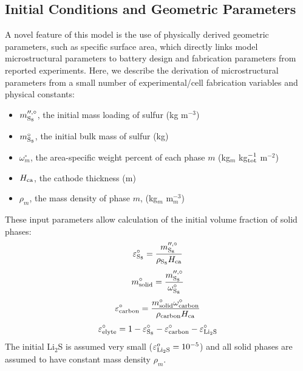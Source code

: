 \documentclass{elsarticle}
\begin{document}
\subsection{Initial Conditions and Geometric Parameters}
A novel feature of this model is the use of physically derived geometric parameters, such as specific surface area, which directly links model microstructural parameters to  battery design and fabrication parameters from reported experiments. Here, we describe the derivation of  microstructural parameters from a small number of experimental/cell fabrication variables and physical constants:
\begin{itemize}
    \item $m^{\prime\prime,\circ}_{\rm S_8}$, the initial mass loading of sulfur (kg m$^{-3}$)
    \item $m^\circ_{\rm S_8}$, the initial bulk mass of sulfur (kg)
    \item $\omega^\circ_m$, the area-specific weight percent of each phase $m$ (kg$_m$ kg$^{-1}_{\rm tot}$ m$^{-2}$)
    \item $H_{\rm ca}$, the cathode thickness (m)
    \item $\rho_m$, the mass density of phase $m$, (kg$_m$ m$^{-3}_m$)
\end{itemize}
These input parameters allow calculation of the initial volume fraction of solid phases:
\begin{equation}\label{eq:esp_S8_o}
    \varepsilon_{\rm S_8}^\circ = \frac{m^{\prime\prime,\circ}_{\rm S_8}}{\rho_{\rm S_8} H_{\rm ca}}
\end{equation}
\begin{equation}\label{eq:m_solid_o}
    m^\circ_{\rm solid} = \frac{m^{\prime\prime,\circ}_{\rm S_8}}{\omega^\circ_{\rm S_8}}
\end{equation}
\begin{equation}\label{eq:eps_carbon_o}
    \varepsilon^\circ_{\rm carbon} = \frac{ m^\circ_{\rm solid}\omega^\circ_{\rm carbon}}{\rho_{\rm carbon}H_{\rm ca}}
\end{equation}
\begin{equation}\label{eq:eps_elyte_o}
    \varepsilon^\circ_{\rm elyte} = 1 - \varepsilon^\circ_{\rm S_8} - \varepsilon^\circ_{\rm carbon} - \varepsilon^\circ_{\rm Li_2S}
\end{equation}
The initial Li$_2$S is assumed very small ($\varepsilon^{o}_{\rm{Li}_2\rm{S}} = 10^{-5}$) and all solid phases are assumed to have constant mass density $\rho_m$.
\end{document}
